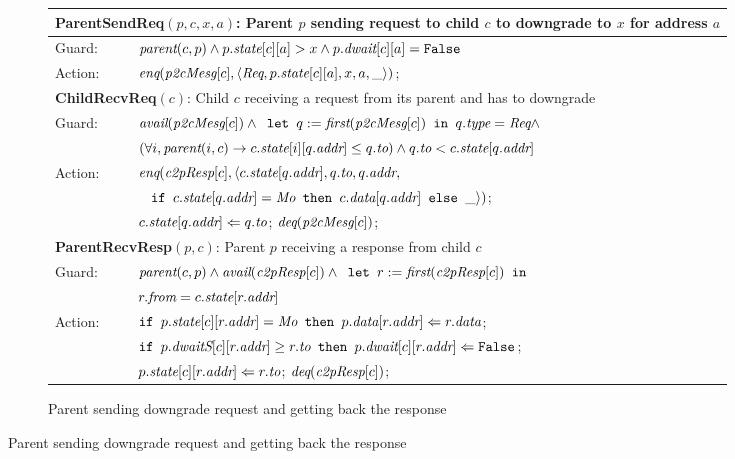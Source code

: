 \begin{figure}
\begin{subfigure}{\textwidth}
\centering
\begin{tabular}{|ll|}
\hline
\multicolumn{2}{|l|}{\textbf{ParentSendReq}$(p, c, x, a)$: Parent $p$ sending request to child $c$ to downgrade to $x$ for address $a$}\\
\hline
Guard: & $\textit{parent}(c,p) \wedge p.\textit{state}[c][a] > x \wedge p.\textit{dwait}[c][a] = \texttt{False}$\\
\hline
Action: & $\textit{enq}(\textit{p2cMesg}[c], \langle \textit{Req}, p.\textit{state}[c][a], x, a, \_ \rangle)$;\\
\hline
\hline
\multicolumn{2}{|p{\textwidth}|}{\textbf{ChildRecvReq}$(c)$: Child $c$ receiving a request from its parent and has to downgrade}\\
\hline
Guard: & 
$\textit{avail}(\textit{p2cMesg}[c]) \wedge \texttt{ let } q := \textit{first}(\textit{p2cMesg}[c]) \texttt{ in } q.\textit{type} = \textit{Req} \wedge$ \\
& $(\forall i, \textit{parent}(i, c) \rightarrow c.\textit{state}[i][q.\textit{addr}] \le q.\textit{to}) \wedge q.\textit{to} < c.\textit{state}[q.\textit{addr}]$\\
\hline
Action: & $\textit{enq}(\textit{c2pResp}[c], \langle c.\textit{state}[q.\textit{addr}], q.\textit{to}, q.\textit{addr},$\\
& $\;\;\;%
\myif c.\state[q.\addr] = \Mo \mythen c.\data[q.\addr] \myelse \_\rangle)$;\\
& $c.\textit{state}[q.\textit{addr}] \Leftarrow q.\textit{to}$; $\textit{deq}(\textit{p2cMesg}[c])$;\\
\hline
\hline
\multicolumn{2}{|l|}{\textbf{ParentRecvResp}$(p, c)$: Parent $p$ receiving a response from child $c$}\\
\hline
Guard: & 
$\textit{parent}(c,p) \wedge \textit{avail}(\textit{c2pResp}[c]) \wedge \texttt{ let } r := \textit{first}(\textit{c2pResp}[c]) \texttt{ in }$\\
& $r.\textit{from} = c.\textit{state}[r.\textit{addr}]$\\
\hline
Action: & $\texttt{if } p.\textit{state}[c][r.\textit{addr}] = \textit{Mo} \texttt{ then } p.\textit{data}[r.\textit{addr}] \Leftarrow r.\textit{data}$;\\
&$\texttt{if } p.\textit{dwaitS}[c][r.\textit{addr}] \ge r.\textit{to} \texttt{ then } p.\textit{dwait}[c][r.\textit{addr}] \Leftarrow \texttt{False} $;\\
& $p.\textit{state}[c][r.\textit{addr}] \Leftarrow r.\textit{to}$; $\textit{deq}(\textit{c2pResp}[c])$;\\
\hline
\end{tabular}
\caption{Parent sending downgrade request and getting back the response}
\end{subfigure}


\end{figure}

